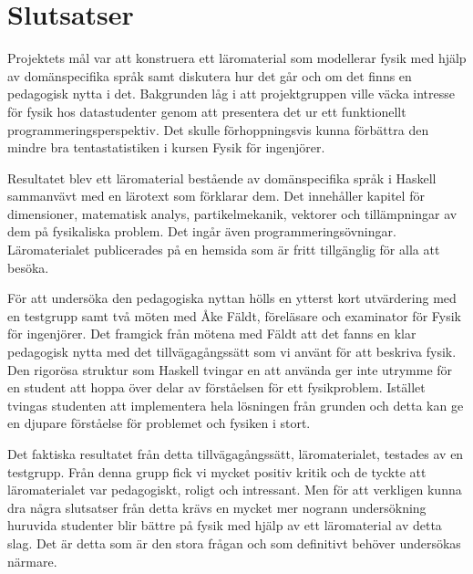 
\chapter{Slutsatser}

\begin{draft}

Projektets mål var att konstruera ett läromaterial som modellerar fysik med
hjälp av domänspecifika språk samt diskutera hur  det går och om det finns en
pedagogisk nytta i det. Bakgrunden låg i att projektgruppen ville väcka intresse
för fysik hos datastudenter genom att presentera det ur ett funktionellt
programmeringsperspektiv. Det skulle förhoppningsvis kunna förbättra den mindre
bra tentastatistiken i kursen Fysik för ingenjörer.

Resultatet blev ett läromaterial bestående av domänspecifika språk i Haskell
sammanvävt med en lärotext som förklarar dem. Det innehåller kapitel för
dimensioner, matematisk analys, partikelmekanik, vektorer och tillämpningar av
dem på fysikaliska problem. Det ingår även programmeringsövningar.
Läromaterialet publicerades på en hemsida som är fritt tillgänglig för alla att
besöka.

För att undersöka den pedagogiska nyttan hölls en ytterst kort utvärdering med
en testgrupp samt två möten med Åke Fäldt, föreläsare och examinator för Fysik
för ingenjörer. Det framgick från mötena med Fäldt att det fanns en klar
pedagogisk nytta med det tillvägagångssätt som vi använt för att beskriva fysik.
Den rigorösa struktur som Haskell tvingar en att använda ger inte utrymme för en
student att hoppa över delar av förståelsen för ett fysikproblem. Istället
tvingas studenten att implementera hela lösningen från grunden och detta kan
ge en djupare förståelse för problemet och fysiken i stort. 

Det faktiska resultatet från detta tillvägagångssätt, läromaterialet,
testades av en testgrupp. Från denna grupp fick vi mycket positiv kritik och de
tyckte att läromaterialet var pedagogiskt, roligt och intressant. Men för att
verkligen kunna dra några slutsatser från detta krävs en mycket mer nogrann
undersökning huruvida studenter blir bättre på fysik med hjälp av ett
läromaterial av detta slag. Det är detta som är den stora frågan och som
definitivt behöver undersökas närmare.

\end{draft}
